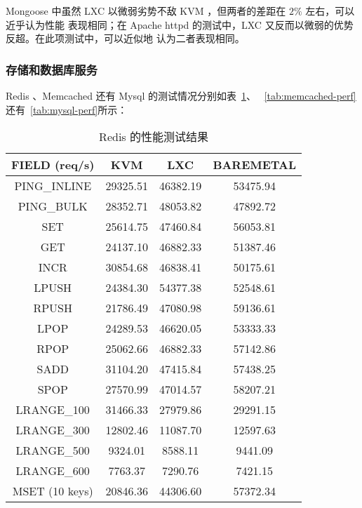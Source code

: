 Mongoose 中虽然 LXC 以微弱劣势不敌 KVM ，但两者的差距在 $2\%$ 左右，可以近乎认为性能
表现相同；在 Apache httpd 的测试中，LXC 又反而以微弱的优势反超。在此项测试中，可以近似地
认为二者表现相同。

\subsubsection{存储和数据库服务}

Redis 、Memcached 还有 Mysql 的测试情况分别如表~\ref{tab:redis-perf}、
~\ref{tab:memcached-perf}还有~\ref{tab:mysql-perf}所示：

\begin{table}[H]
    \centering
    \caption{Redis 的性能测试结果}
    \begin{tabular}{||c c c c||}
        \hline
        FIELD (req/s) & KVM & LXC & BAREMETAL \\
        \hline
        \hline
        PING\_INLINE & 29325.51 & 46382.19 & 53475.94 \\
        \hline
        PING\_BULK & 28352.71 & 48053.82 & 47892.72 \\
        \hline
        SET & 25614.75 & 47460.84 & 56053.81 \\
        \hline
        GET & 24137.10 & 46882.33 & 51387.46 \\
        \hline
        INCR & 30854.68 & 46838.41 & 50175.61 \\
        \hline
        LPUSH & 24384.30 & 54377.38 & 52548.61 \\
        \hline
        RPUSH & 21786.49 & 47080.98 & 59136.61 \\
        \hline
        LPOP & 24289.53 & 46620.05 & 53333.33 \\
        \hline
        RPOP & 25062.66 & 46882.33 & 57142.86 \\
        \hline
        SADD & 31104.20 & 47415.84 & 57438.25 \\
        \hline
        SPOP & 27570.99 & 47014.57 & 58207.21 \\
        \hline
        LRANGE\_100 & 31466.33 & 27979.86 & 29291.15 \\
        \hline
        LRANGE\_300 & 12802.46 & 11087.70 & 12597.63 \\
        \hline
        LRANGE\_500 & 9324.01 & 8588.11 & 9441.09 \\
        \hline
        LRANGE\_600 & 7763.37 & 7290.76 & 7421.15 \\
        \hline
        MSET (10 keys) & 20846.36 & 44306.60 & 57372.34 \\
        \hline
    \end{tabular}
    \label{tab:redis-perf}
\end{table}

